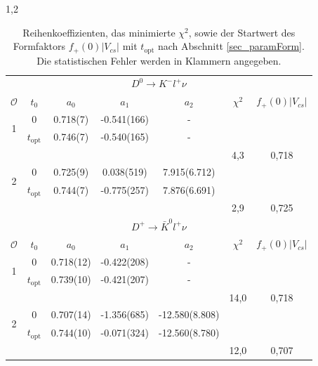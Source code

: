 \documentclass[11pt,a4paper,twoside]{report}
\begin{document}
\begin{spacing}{1,2}
 \renewcommand{\arraystretch}{1.2}
\begin{table}[h]
 \begin{tabular}{cc|ccccc}
 \toprule
  \multicolumn{7}{c}{$D^0 \rightarrow  K^- l^+ \nu$} \\
   $\mathcal{O}$ & $t_0$ & $a_0$ & $a_1$ & $a_2$ & $\chi^2$ & $f_+(0)|V_{cs}|$\\
   \midrule
   \multirow{2}{*}{1} & 0 & 0.718(7) & -0.541(166) & - &  &\\
   & $t_\text{opt}$ & 0.746(7) & -0.540(165) & -\\
   & & & &  & 4,3 &0,718 \\
   \hline
      \multirow{2}{*}{2} & 0 & 0.725(9) & 0.038(519) & 7.915(6.712) & &\\
   & $t_\text{opt}$ & 0.744(7) & -0.775(257) & 7.876(6.691)\\
     & & & & & 2,9&0,725 \\
     \midrule\midrule
   \multicolumn{7}{c}{$D^+ \rightarrow  \bar K^0 l^+ \nu$ } \\
   $\mathcal{O}$ & $t_0$ & $a_0$ & $a_1$ & $a_2$ & $\chi^2$ &$f_+(0)|V_{cs}|$\\
   \midrule
   \multirow{2}{*}{1} & 0 & 0.718(12) & -0.422(208) & - &  &\\
   & $t_\text{opt}$ & 0.739(10) & -0.421(207) & -\\
   & & & & & 14,0 & 0,718 \\
   \hline
      \multirow{2}{*}{2} & 0 & 0.707(14) & -1.356(685) & -12.580(8.808) &  &\\
   & $t_\text{opt}$ & 0.744(10) & -0.071(324) & -12.560(8.780)\\
     & & & & &12,0 &0,707 \\
     \bottomrule\bottomrule
 \end{tabular}
\caption[Reihenkoeffizienten, das minimierte $\chi^2$, sowie der Startwert des Formfaktors $f_+(0)|V_{cs}|$.]{Reihenkoeffizienten, das minimierte $\chi^2$, sowie der Startwert des Formfaktors $f_+(0)|V_{cs}|$ mit $t_\text{opt}$ nach Abschnitt \ref{sec_paramForm}. 
Die statistischen Fehler werden in Klammern angegeben.}
\label{tab_ResChiF0Ai}
\end{table}
 \renewcommand{\arraystretch}{1.0}

\noindent

\end{spacing}
\end{document}
